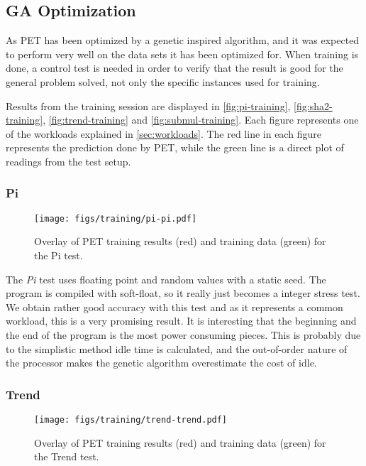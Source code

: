 \subsection{GA Optimization}

As PET has been optimized by a genetic inspired algorithm, and it was expected
to perform very well on the data sets it has been optimized for. When training
is done, a control test is needed in order to verify that the result is good for
the general problem solved, not only the specific instances used for training.

Results from the training session are displayed in \autoref{fig:pi-training},
\autoref{fig:sha2-training}, \autoref{fig:trend-training} and
\autoref{fig:submul-training}. Each figure represents one of the workloads
explained in \autoref{sec:workloads}. The red line in each figure represents the
prediction done by PET, while the green line is a direct plot of readings from
the test setup.

\newpage

\subsubsection{Pi}
\begin{figure}[htb]
    \centering
    \texttt{[image: figs/training/pi-pi.pdf]}
    \caption{Overlay of PET training results (red) and training data (green) for the Pi test.}
    \label{fig:pi-training}
\end{figure}

The \emph{Pi} test uses floating point and random values with a static seed. The
program is compiled with soft-float, so it really just becomes a integer stress
test. We obtain rather good accuracy with this test and as it represents a
common workload, this is a very promising result. It is interesting that the
beginning and the end of the program is the most power consuming pieces. This is
probably due to the simplistic method idle time is calculated, and the
out-of-order nature of the processor makes the genetic algorithm overestimate
the cost of idle.

\newpage

\subsubsection{Trend}
\begin{figure}[htb]
    \centering
    \texttt{[image: figs/training/trend-trend.pdf]}
    \caption{Overlay of PET training results (red) and training data (green) for the Trend test.}
    \label{fig:trend-training}
\end{figure}

